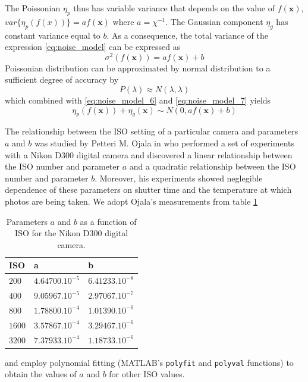 \documentclass[12pt,notitlepage]{report}
\begin{document}
The Poissonian $\eta_p$ thus has variable variance that depends on the value of $f(\mathbf{x})$, $var\lbrace \eta_p (f(x) ) \rbrace = af(\mathbf{x})$ where $a=\chi^{-1}$. The Gaussian component $\eta_g$ has constant variance equal to $b$. As a consequence, the total variance of the expression \ref{eq:noise_model} can be expressed as
\begin{equation}
\label{eq:noise_model_7}
	\sigma^{2}(f(\mathbf{x})) = a f(\mathbf{x}) + b
\end{equation}
Poissonian distribution can be approximated by normal distribution to a sufficient degree of accuracy by
\begin{equation}
\label{eq:noise_model_8}
	P(\lambda) \approx N(\lambda, \lambda)
\end{equation}
which combined with \ref{eq:noise_model_6} and \ref{eq:noise_model_7} yields 
\begin{equation}
\label{eq:noise_model_9}
	\eta_p(f(\mathbf{x})) +  \eta_g(\mathbf{x}) \sim N(0, a f(\mathbf{x}) + b)
\end{equation}

The relationship between the ISO setting of a particular camera and parameters $a$ and $b$ was studied by Petteri M. Ojala in \cite{ojal08} who performed a set of experiments with a Nikon D300 digital camera and discovered a linear relationship between the ISO number and parameter $a$ and a quadratic relationship between the ISO number and parameter $b$. Moreover, his experiments showed neglegible dependence of these parameters on shutter time and the temperature at which photos are being taken. 
We adopt Ojala's measurements from table \ref{tab:ojal}
\begin{table}
  \begin{center}
  \begin{tabular}{ |l | l | l | }
    \hline
	ISO & a & b \\ \hline
    $200$ & $4.64700.10^{-5}$& $6.41233.10^{-8}$ \\ \hline
    $400$ & $9.05967.10^{-5}$ & $2.97067.10^{-7}$ \\ \hline
    $800$ & $1.78800.10^{-4}$ & $1.01390.10^{-6}$ \\ \hline
    $1600$ & $3.57867.10^{-4}$ & $3.29467.10^{-6}$ \\ \hline
    $3200$ & $7.37933.10^{-4}$ & $1.18733.10^{-6}$ \\
    \hline
  \end{tabular}
  \end{center}
  \caption{Parameters $a$ and $b$ as a function of ISO for the Nikon D300 digital camera.}
  \label{tab:ojal}
\end{table}
and employ polynomial fitting (MATLAB's \texttt{polyfit} and \texttt{polyval} functions) to obtain the values of $a$ and $b$ for other ISO values. 
\end{document}

